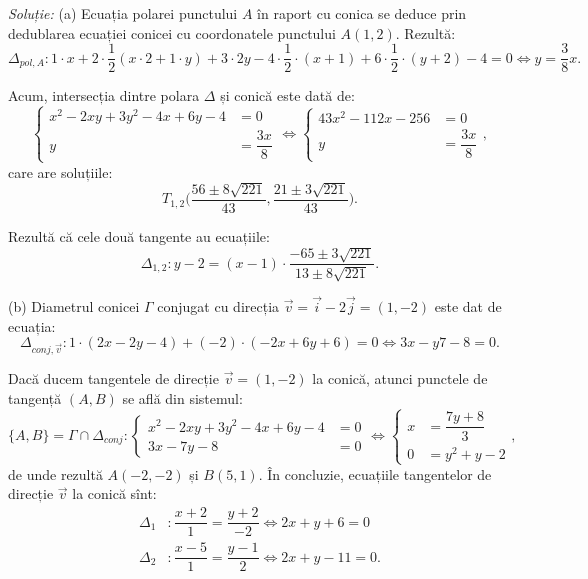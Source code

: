 \documentclass[11pt,a4paper]{article}
\theoremstyle{dotless}
\theoremstyle{dotlessdr}
\begin{document}
\emph{Soluție:}
	(a) Ecuația polarei punctului $A$ în raport cu conica se deduce prin
dedublarea ecuației conicei cu coordonatele punctului $A(1,2)$. Rezultă: 
 \[
	\Delta_{pol, A}: 1 \cdot x + 2 \cdot \dfrac{1}{2}(x \cdot 2 + 1 \cdot y)
	+ 3 \cdot 2y - 4 \cdot \dfrac{1}{2} \cdot (x + 1) + 
	6 \cdot \dfrac{1}{2}\cdot (y + 2) - 4 = 0 \Longleftrightarrow 
	y = \dfrac{3}{8} x.
\]

Acum, intersecția dintre polara $\Delta$ și conică este dată de: 
 \[
	\begin{cases}	
	    x^2 - 2xy + 3y^2 - 4x + 6y - 4 &= 0 \\
	    y &= \dfrac{3x}{8}
    \end{cases} \Longleftrightarrow  \begin{cases}	
	                                     43x^2 - 112 x - 256 &= 0 \\
	                                     y &= \dfrac{3x}{8}
                                     \end{cases},
\]
care are soluțiile: 
 \[
	T_{1,2} \Big( \dfrac{56 \pm 8 \sqrt{221}}{43}, 
	\dfrac{21 \pm 3 \sqrt{221}}{43} \Big).
\]

Rezultă că cele două tangente au ecuațiile: 
 \[
	\Delta_{1,2}: y - 2 = (x - 1) \cdot 
	\dfrac{-65 \pm 3 \sqrt{221}}{13 \pm 8 \sqrt{221}}.
\]

(b) Diametrul conicei $\Gamma$ conjugat cu direcția 
$\vec{v} = \vec{i} - 2 \vec{j} = (1, -2)$ este dat de ecuația: 
 \[
	\Delta_{conj, \vec{v}}: 1 \cdot (2x - 2y - 4) + (-2) \cdot (-2x + 6y + 6) 
	= 0 \Longleftrightarrow 3x - y7 - 8 = 0.
\]

Dacă ducem tangentele de direcție $\vec{v} = (1, -2)$ la conică, atunci punctele
 de tangență $(A,B)$ se află din sistemul: 
 \[
	\{A, B\} = \Gamma \cap \Delta_{conj}:
	\begin{cases}	
	    x^2 - 2xy + 3y^2 - 4x + 6y - 4 &= 0 \\
	    3x - 7y - 8 &= 0
    \end{cases} \Longleftrightarrow \begin{cases}	
	                                    x &= \dfrac{7y + 8}{3} \\
	                                    0 &= y^2 + y - 2
                                    \end{cases},
\]
de unde rezultă $A(-2, -2)$ și $B(5, 1)$. În concluzie, ecuațiile tangentelor
de direcție $\vec{v}$ la conică sînt:
\begin{align*}
	\Delta_1 &: \dfrac{x + 2}{1} = \dfrac{y + 2}{-2} \Longleftrightarrow 
	            2x + y + 6 = 0 \\
	\Delta_2 &: \dfrac{x-5}{1} = \dfrac{y - 1}{2} \Longleftrightarrow 
	            2x + y - 11 = 0.
\end{align*}
\end{document}
